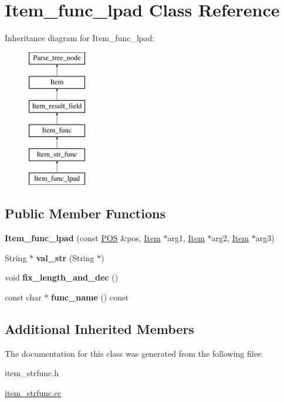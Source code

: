 \hypertarget{classItem__func__lpad}{}\section{Item\+\_\+func\+\_\+lpad Class Reference}
\label{classItem__func__lpad}
Inheritance diagram for Item\+\_\+func\+\_\+lpad\+:\begin{figure}[H]
\begin{center}
\leavevmode
\includegraphics[height=6.000000cm]{classItem__func__lpad}
\end{center}
\end{figure}
\subsection*{Public Member Functions}
\begin{DoxyCompactItemize}
\item 
\mbox{\label{classItem__func__lpad_a970d1b6d868afd247aa2a739ca1c091c}} 
{\bfseries Item\+\_\+func\+\_\+lpad} (const \mbox{\hyperlink{structYYLTYPE}{P\+OS}} \&pos, \mbox{\hyperlink{classItem}{Item}} $\ast$arg1, \mbox{\hyperlink{classItem}{Item}} $\ast$arg2, \mbox{\hyperlink{classItem}{Item}} $\ast$arg3)
\item 
\mbox{\label{classItem__func__lpad_a092d5d2d6cf2829de866348a5789be23}} 
String $\ast$ {\bfseries val\+\_\+str} (String $\ast$)
\item 
\mbox{\label{classItem__func__lpad_a4bec93aa51503b7288fa4a3041c6ed11}} 
void {\bfseries fix\+\_\+length\+\_\+and\+\_\+dec} ()
\item 
\mbox{\label{classItem__func__lpad_abf379ffcd35735b2d43ddf8f39fd184f}} 
const char $\ast$ {\bfseries func\+\_\+name} () const
\end{DoxyCompactItemize}
\subsection*{Additional Inherited Members}


The documentation for this class was generated from the following files\+:\begin{DoxyCompactItemize}
\item 
item\+\_\+strfunc.\+h\item 
\mbox{\hyperlink{item__strfunc_8cc}{item\+\_\+strfunc.\+cc}}\end{DoxyCompactItemize}
